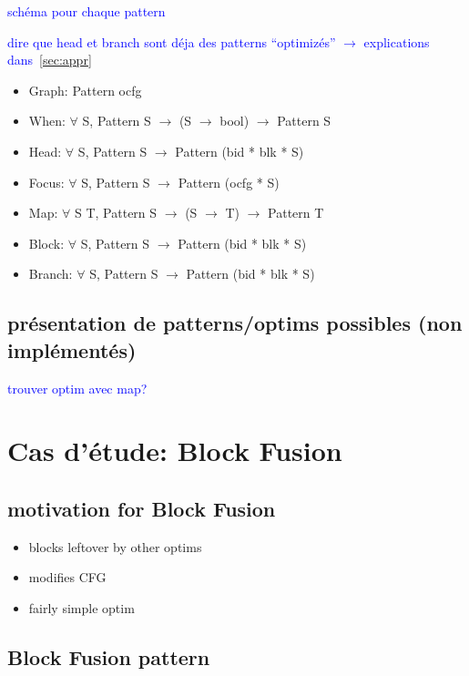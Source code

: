 \documentclass[11pt]{article}
\newcommand{\leon}[1]{\textcolor{blue}{#1}}
\begin{document}
\leon{schéma pour chaque pattern}

\leon{dire que head et branch sont déja des patterns ``optimizés'' $\rightarrow$ explications dans~\ref{sec:appr}}

\begin{itemize}
  \item Graph: Pattern ocfg
  \item When: $\forall$ {S}, Pattern S $\rightarrow$ (S $\rightarrow$ bool) $\rightarrow$ Pattern S
  \item Head: $\forall$ {S}, Pattern S $\rightarrow$ Pattern (bid * blk * S)
  \item Focus: $\forall$ {S}, Pattern S $\rightarrow$ Pattern (ocfg * S)
  \item Map: $\forall$ {S} {T}, Pattern S $\rightarrow$ (S $\rightarrow$ T) $\rightarrow$ Pattern T
  \item Block: $\forall$ {S}, Pattern S $\rightarrow$ Pattern (bid * blk * S)
  \item Branch: $\forall$ {S}, Pattern S $\rightarrow$ Pattern (bid * blk * S)
\end{itemize}

\subsection{présentation de patterns/optims possibles (non implémentés)}

\leon{trouver optim avec map?}

\section{Cas d'étude: Block Fusion}
\label{sec:case}

\subsection{motivation for Block Fusion}

\begin{itemize}
  \item blocks leftover by other optims
  \item modifies CFG
  \item fairly simple optim
\end{itemize}

\subsection{Block Fusion pattern}
\end{document}
